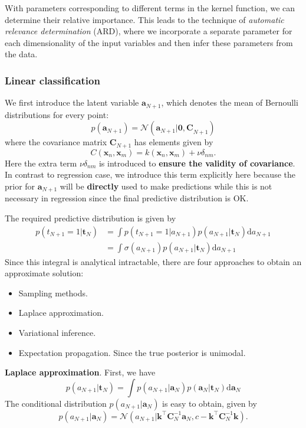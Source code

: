 \documentclass[a4paper]{book}
\newcommand{\ud}{\mathrm{d}}
\renewcommand{\bf}{\mathbf}
\renewcommand{\cal}{\mathcal}
\newcommand{\imp}[1]{\textit{#1}}
\begin{document}
With parameters corresponding to different terms in the kernel function, we can determine their relative importance. This leads to the technique of \imp{automatic relevance determination} (ARD), where we incorporate a separate parameter for each dimensionality of the input variables and then infer these parameters from the data.
\subsubsection{Linear classification}
We first introduce the latent variable $\bf{a}_{N+1}$, which denotes the mean of Bernoulli distributions for every point:
\begin{equation}
	p(\bf{a}_{N+1}) = \cal{N}(\bf{a}_{N+1}|\bf{0,C}_{N+1})
\end{equation}
where the covariance matrix $\bf{C}_{N+1}$ has elements given by
\begin{equation}
	C(\bf{x}_n,\bf{x}_m) = k(\bf{x}_n,\bf{x}_m) + \nu \delta_{nm}.
\end{equation}
Here the extra term $\nu \delta_{nm}$ is introduced to \textbf{ensure the validity of covariance}. In contrast to regression case, we introduce this term explicitly here because the prior for $\bf{a}_{N+1}$ will be \textbf{directly} used to make predictions while this is not necessary in regression since the final predictive distribution is OK.

The required predictive distribution is given by
\begin{align}
	p(t_{N+1} = 1|\bf{t}_N) &= \int p(t_{N+1} = 1|a_{N+1})p(a_{N+1}|\bf{t}_N) \ud a_{N+1}\\
	&=  \int \sigma(a_{N+1}) p(a_{N+1}|\bf{t}_N) \ud a_{N+1}
\end{align}
Since this integral is analytical intractable, there are four approaches to obtain an approximate solution:
\begin{itemize}
	\item Sampling methods.
	\item Laplace approximation.
	\item Variational inference.
	\item Expectation propagation. Since the true posterior is unimodal.
\end{itemize}

\textbf{Laplace approximation}. First, we have
\begin{equation}
	p(a_{N+1}|\bf{t}_N) = \int p(a_{N+1}|\bf{a}_N)p(\bf{a}_N|\bf{t}_N) \ud \bf{a}_N
\end{equation}
The conditional distribution $p(a_{N+1}|\bf{a}_N)$ is easy to obtain, given by
\begin{equation}
	p(a_{N+1}|\bf{a}_N) = \cal{N}(a_{N+1}|\bf{k}^{\intercal} \bf{C}_N^{-1}\bf{a}_N, c-\bf{k}^{\intercal}\bf{C}_N^{-1}\bf{k}).
\end{equation}
\end{document}
